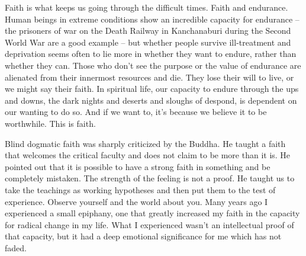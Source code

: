 Faith is what keeps us going through the difficult times. Faith and
endurance. Human beings in extreme conditions show an incredible
capacity for endurance -- the prisoners of war on the Death Railway in
Kanchanaburi during the Second World War are a good example -- but
whether people survive ill-treatment and deprivation seems often to lie
more in whether they want to endure, rather than whether they can. Those
who don't see the purpose or the value of endurance are alienated from
their innermost resources and die. They lose their will to live, or we
might say their faith. In spiritual life, our capacity to endure through
the ups and downs, the dark nights and deserts and sloughs of despond,
is dependent on our wanting to do so. And if we want to, it's because we
believe it to be worthwhile. This is faith.

Blind dogmatic faith was sharply criticized by the Buddha. He taught a
faith that welcomes the critical faculty and does not claim to be more
than it is. He pointed out that it is possible to have a strong faith in
something and be completely mistaken. The strength of the feeling is not
a proof. He taught us to take the teachings as working hypotheses and
then put them to the test of experience. Observe yourself and the world
about you. Many years ago I experienced a small epiphany, one that
greatly increased my faith in the capacity for radical change in my
life. What I experienced wasn't an intellectual proof of that capacity,
but it had a deep emotional significance for me which has not faded.

